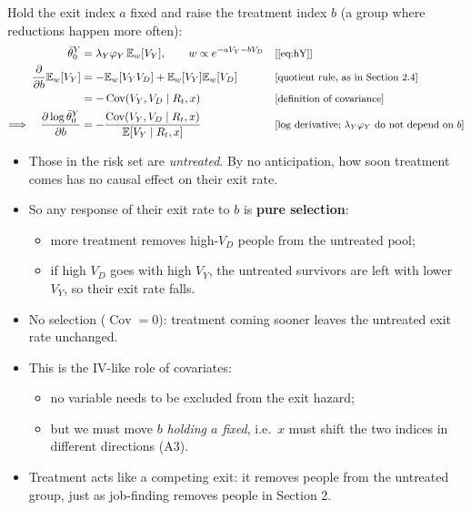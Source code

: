 \documentclass[11pt]{article}
\newcommand{\E}{\mathbb{E}}
\newcommand{\1}{\mathbf{1}}
\newcommand{\cov}{\operatorname{Cov}}
\newcommand{\why}[1]{\text{\small[#1]}}
\begin{document}
Hold the exit index $a$ fixed and raise the treatment index $b$ (a group where reductions happen more often):
\begin{align}
  \bar\theta^Y_0 &= \lambda_Y\varphi_Y\,\E_w[V_Y], \qquad w\propto e^{-aV_Y-bV_D} && \why{\eqref{eq:hY}} \nonumber\\
  \frac{\partial}{\partial b}\E_w[V_Y] &= -\E_w[V_YV_D]+\E_w[V_Y]\E_w[V_D] && \why{quotient rule, as in Section 2.4} \nonumber\\
  &= -\cov(V_Y,V_D\mid R_t,x) && \why{definition of covariance} \nonumber\\
  \Longrightarrow\quad \frac{\partial\log \bar\theta^Y_0}{\partial b} &= -\frac{\cov(V_Y,V_D\mid R_t,x)}{\E[V_Y\mid R_t,x]} && \why{$\log$ derivative; $\lambda_Y\varphi_Y$ do not depend on $b$} \label{eq:fingerprint}
\end{align}
\begin{itemize}
  \item Those in the risk set are \emph{untreated}. By no anticipation, how soon treatment comes has no causal effect on their exit rate.
  \item So any response of their exit rate to $b$ is \textbf{pure selection}:
    \begin{itemize}
      \item more treatment removes high-$V_D$ people from the untreated pool;
      \item if high $V_D$ goes with high $V_Y$, the untreated survivors are left with lower $V_Y$, so their exit rate falls.
    \end{itemize}
  \item No selection ($\cov=0$): treatment coming sooner leaves the untreated exit rate unchanged.
  \item This is the IV-like role of covariates:
    \begin{itemize}
      \item no variable needs to be excluded from the exit hazard;
      \item but we must move $b$ \emph{holding $a$ fixed}, i.e.\ $x$ must shift the two indices in different directions (A3).
    \end{itemize}
  \item Treatment acts like a competing exit: it removes people from the untreated group, just as job-finding removes people in Section 2.
\end{itemize}
\end{document}
